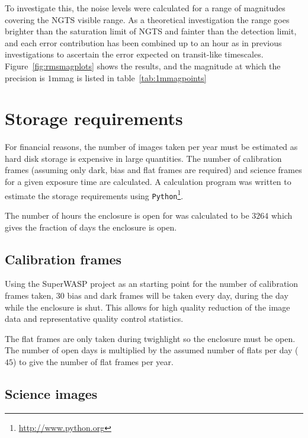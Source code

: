 \documentclass[11pt,a4paper]{report}
\begin{document}
To investigate this, the noise levels were calculated for a range of
magnitudes covering the NGTS visible range. As a theoretical
investigation the range goes brighter than the saturation limit of NGTS
and fainter than the detection limit, and each error contribution has
been combined up to an hour as in previous investigations to ascertain
the error expected on transit-like timescales.
Figure~\ref{fig:rmsmagplots} shows the results, and the magnitude at
which the precision is $1$mmag  is listed in table~\ref{tab:1mmagpoints}



\section{Storage requirements}

For financial reasons, the number of images taken per year must be
estimated as hard disk storage is expensive in large quantities. The
number of calibration frames (assuming only dark, bias and flat frames
are required) and science frames for a given exposure time are
calculated. A calculation program was written to estimate the storage
requirements using
\texttt{Python}\footnote{\url{http://www.python.org}}.

The number of hours the enclosure is open for was calculated
\citep{bento11} to be $3264$ which gives the fraction of days the
enclosure is open. 

\subsection{Calibration frames}
\label{sec:calibframes}

Using the SuperWASP project as an starting point for the number of
calibration frames taken, $30$ bias and dark frames will be taken every
day, during the day while the enclosure is shut. This allows for high
quality reduction of the image data and representative quality control
statistics. 

The flat frames are only taken during twighlight so the enclosure must
be open. The number of open days is multiplied by the assumed number of flats per
day ($45$) to give the number of flat frames per year. 



\subsection{Science images}
\end{document}
